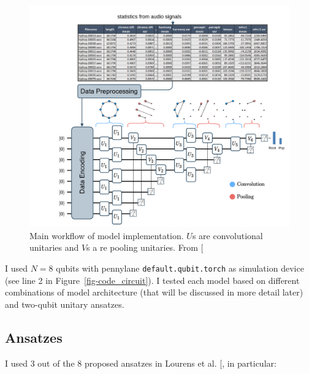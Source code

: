 \documentclass[
  13pt,
  a4paper,
  DIV=11,
  numbers=noendperiod]{scrreprt}
\begin{document}
\begin{figure}[H]

{\centering \includegraphics{chapters/../img/workflow.png}

}

\caption{Main workflow of model implementation. \(U\)s are convolutional
unitaries and \(V\)s a re pooling unitaries. From
{[}\citeproc{ref-lourens2023hierarchical}{1}{]}}

\end{figure}%

I used \(N = 8\) qubits with pennylane \texttt{default.qubit.torch} as
simulation device (see line 2 in Figure~\ref{fig-code_circuit}). I
tested each model based on different combinations of model architecture
(that will be discussed in more detail later) and two-qubit unitary
ansatzes.

\subsection{Ansatzes}\label{ansatzes}

I used 3 out of the 8 proposed ansatzes in Lourens et al.
{[}\citeproc{ref-lourens2023hierarchical}{1}{]}, in particular:
\end{document}
